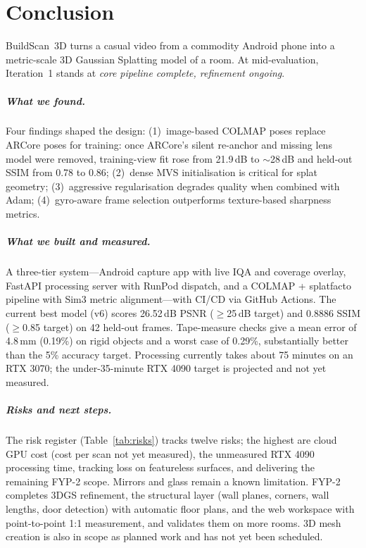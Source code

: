 \chapter{Conclusion}

BuildScan~3D turns a casual video from a commodity Android phone into a metric-scale 3D Gaussian Splatting model of a room. At mid-evaluation, Iteration~1 stands at \emph{core pipeline complete, refinement ongoing}.

\paragraph{What we found.} Four findings shaped the design: (1)~image-based COLMAP poses replace ARCore poses for training: once ARCore's silent re-anchor and missing lens model were removed, training-view fit rose from 21.9\,dB to $\sim$28\,dB and held-out SSIM from 0.78 to 0.86; (2)~dense MVS initialisation is critical for splat geometry; (3)~aggressive regularisation degrades quality when combined with Adam; (4)~gyro-aware frame selection outperforms texture-based sharpness metrics.

\paragraph{What we built and measured.} A three-tier system---Android capture app with live IQA and coverage overlay, FastAPI processing server with RunPod dispatch, and a COLMAP + splatfacto pipeline with Sim3 metric alignment---with CI/CD via GitHub Actions. The current best model (v6) scores 26.52\,dB PSNR ($\geq$25\,dB target) and 0.8886 SSIM ($\geq$0.85 target) on 42 held-out frames. Tape-measure checks give a mean error of 4.8\,mm (0.19\%) on rigid objects and a worst case of 0.29\%, substantially better than the 5\% accuracy target. Processing currently takes about 75 minutes on an RTX 3070; the under-35-minute RTX 4090 target is projected and not yet measured.

\paragraph{Risks and next steps.} The risk register (Table~\ref{tab:risks}) tracks twelve risks; the highest are cloud GPU cost (cost per scan not yet measured), the unmeasured RTX 4090 processing time, tracking loss on featureless surfaces, and delivering the remaining FYP-2 scope. Mirrors and glass remain a known limitation. FYP-2 completes 3DGS refinement, the structural layer (wall planes, corners, wall lengths, door detection) with automatic floor plans, and the web workspace with point-to-point 1:1 measurement, and validates them on more rooms. 3D mesh creation is also in scope as planned work and has not yet been scheduled.
